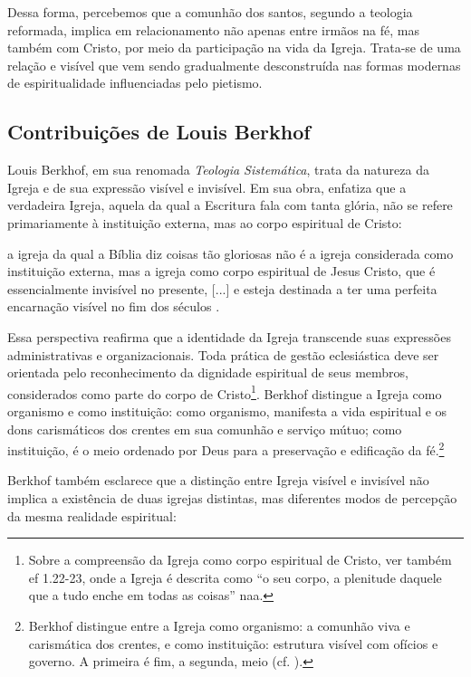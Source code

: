 Dessa forma, percebemos que a comunhão dos santos, segundo a teologia reformada, implica em relacionamento não apenas entre irmãos na fé, mas também com Cristo, por meio da participação na vida da Igreja. Trata-se de uma relação  e visível que vem sendo gradualmente desconstruída nas formas modernas de espiritualidade influenciadas pelo pietismo.

\subsection{Contribuições de Louis Berkhof}

Louis Berkhof, em sua renomada \textit{Teologia Sistemática}, trata da natureza da Igreja e de sua expressão visível e invisível. Em sua obra, enfatiza que a verdadeira Igreja, aquela da qual a Escritura fala com tanta glória, não se refere primariamente à instituição externa, mas ao corpo espiritual de Cristo:

\begin{citacao}
    a igreja da qual a Bíblia diz coisas tão gloriosas não é a igreja considerada como instituição externa, mas a igreja como corpo espiritual de Jesus Cristo, que é essencialmente invisível no presente, [...] e esteja destinada a ter uma perfeita encarnação visível no fim dos séculos \cite[p.~644]{berkhof2012}.
\end{citacao}

Essa perspectiva reafirma que a identidade da Igreja transcende suas expressões administrativas e organizacionais. Toda prática de gestão eclesiástica deve ser orientada pelo reconhecimento da dignidade espiritual de seus membros, considerados como parte do corpo de Cristo\footnote{Sobre a compreensão da Igreja como corpo espiritual de Cristo, ver também \gls{ef} 1.22-23, onde a Igreja é descrita como ``o seu corpo, a plenitude daquele que a tudo enche em todas as coisas'' \gls{naa}.}. Berkhof distingue a Igreja como organismo e como instituição: como organismo, manifesta a vida espiritual e os dons carismáticos dos crentes em sua comunhão e serviço mútuo; como instituição, é o meio ordenado por Deus para a preservação e edificação da fé.\footnote{Berkhof distingue entre a Igreja como organismo: a comunhão viva e carismática dos crentes, e como instituição: estrutura visível com ofícios e governo. A primeira é fim, a segunda, meio (cf. \cite[p.~638]{berkhof2012}).}

Berkhof também esclarece que a distinção entre Igreja visível e invisível não implica a existência de duas igrejas distintas, mas diferentes modos de percepção da mesma realidade espiritual:

